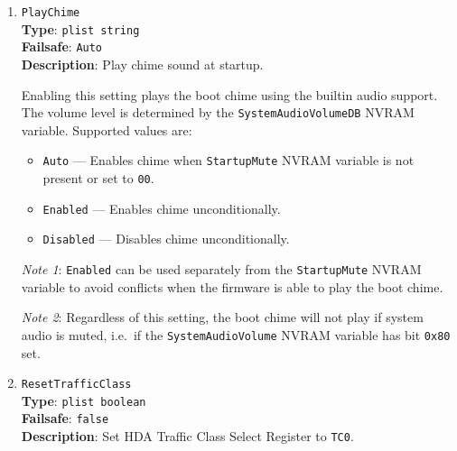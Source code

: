 \documentclass[]{article}
\providecommand{\tightlist}{%
  \setlength{\itemsep}{0pt}\setlength{\parskip}{0pt}}
\begin{document}
\begin{enumerate}
  The boot chime will not play if the system amplifier gain level in the
  \texttt{SystemAudioVolumeDB} NVRAM variable is lower than this.

  \emph{Note 1}: This setting is designed to save unnecessary pauses due to audio setup at inaudible volume
  levels, when no sound will be heard anyway. Whether there are inaudible volume levels depends on the
  hardware. On some hardware (including Apple) the audio values are well enough matched to the hardware
  that the lowest volume levels available are very quiet but audible, whereas on some other hardware combinations,
  the lowest part of the volume range may not be audible at all.

  \emph{Note 2}: See \texttt{MaximumGain} for an explanation of decibel volume levels.

\item
  \texttt{PlayChime}\\
  \textbf{Type}: \texttt{plist\ string}\\
  \textbf{Failsafe}: \texttt{Auto}\\
  \textbf{Description}: Play chime sound at startup.

  Enabling this setting plays the boot chime using the builtin audio support. The volume
  level is determined by the \texttt{SystemAudioVolumeDB} NVRAM variable. Supported values are:

  \begin{itemize}
    \tightlist
    \item \texttt{Auto} --- Enables chime when \texttt{StartupMute} NVRAM variable
      is not present or set to \texttt{00}.
    \item \texttt{Enabled} --- Enables chime unconditionally.
    \item \texttt{Disabled} --- Disables chime unconditionally.
  \end{itemize}

  \emph{Note 1}: \texttt{Enabled} can be used separately from the \texttt{StartupMute}
  NVRAM variable to avoid conflicts when the firmware is able to play the boot chime.

  \emph{Note 2}: Regardless of this setting, the boot chime will not play if system audio is muted,
  i.e.~if the \texttt{SystemAudioVolume} NVRAM variable has bit \texttt{0x80} set.

\item
  \texttt{ResetTrafficClass}\\
  \textbf{Type}: \texttt{plist\ boolean}\\
  \textbf{Failsafe}: \texttt{false}\\
  \textbf{Description}: Set HDA Traffic Class Select Register to \texttt{TC0}.


\end{enumerate}
\end{document}
